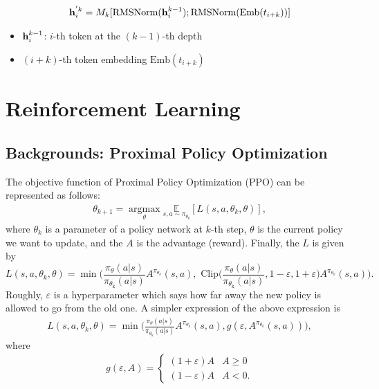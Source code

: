 \begin{align*}
	{\mathbf{h}}_i^{'k} = M_k[\text{RMSNorm}({\mathbf{h}}_i^{k-1}); \text{RMSNorm}(\text{Emb}(t_{i+k}))]
\end{align*}
\begin{itemize}
	\item ${\mathbf{h}}_i^{k-1}$: $i$-th token at the $(k-1)$-th depth 
	\item $(i+k)$-th token embedding $\text{Emb}(t_{i+k})$
\end{itemize}

\section{Reinforcement Learning}
\subsection{Backgrounds: Proximal Policy Optimization}
The objective function of Proximal Policy Optimization (PPO) can be represented as follows:
\begin{align*}
	\theta_{k+1} = \underset{\theta}{\operatorname{argmax}} \underset{s,a\sim \pi_{\theta_k}}{\mathbb{E}} [L(s, a, \theta_k, \theta)],
\end{align*}
where $\theta_{k}$ is a parameter of a policy network at $k$-th step, $\theta$ is the current policy we want to update, and the $A$ is the advantage (\ie reward). Finally, the $L$ is given by
$$L(s, a, \theta_k, \theta) = \min \Bigg(\frac{\pi_{\theta}\left(a | s\right)}{\pi_{\theta_{\text {k}}}\left(a | s\right)} A^{\pi_{\theta_k}}(s,a), \textrm{ Clip}\Bigg(\frac{\pi_{\theta}\left(a | s\right)}{\pi_{\theta_{\text {k}}}\left(a | s\right)}, 1-\varepsilon, 1+\varepsilon\Bigg) A^{\pi_{\theta_k}}(s,a)\Bigg).$$
Roughly, $\varepsilon$ is a hyperparameter which says how far away the new policy is allowed to go from the old one. A simpler expression of the above expression is
\begin{align}
	L(s, a, \theta_k, \theta) = \min \Bigg(\frac{\pi_{\theta}\left(a | s\right)}{\pi_{\theta_{\text {k}}}\left(a | s\right)} A^{\pi_{\theta_k}}(s,a), g(\varepsilon, A^{\pi_{\theta_k}}(s,a)) \Bigg),
	\label{eq:ppo_objective}
\end{align}
where 
\begin{align}
	g(\varepsilon,A) = 
	\begin{cases}
		(1+\varepsilon)A & A\geq 0\\
		(1-\varepsilon)A & A< 0.
	\end{cases}
	\label{eq:ppo_clip}
\end{align}

